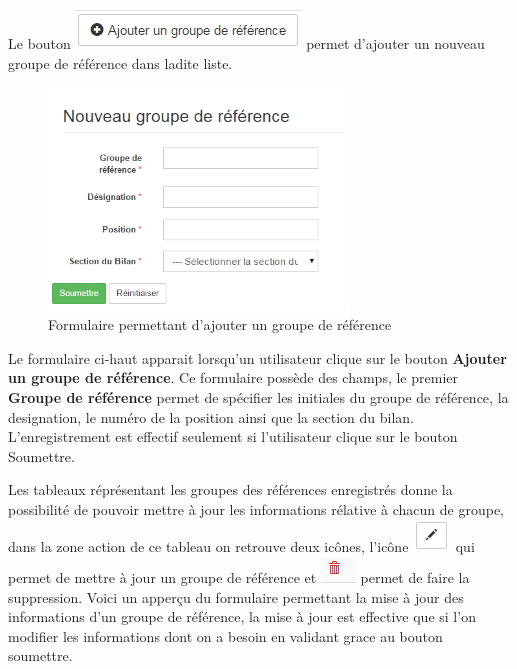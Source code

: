 \documentclass[12pt,a4paper]{report}
\begin{document}
Le bouton \includegraphics[scale=0.7]{pic/AddREfGroup.png} permet d'ajouter un nouveau groupe de référence dans ladite liste.

\begin{figure}[h]
\begin{center}
\includegraphics[width=8cm]{pic/FormGrRef.png}
\end{center}
\caption{Formulaire permettant d'ajouter un groupe de référence}
\label{Formulaire permettant d'ajouter un groupe de référence}
\end{figure}

Le formulaire ci-haut apparait lorsqu'un utilisateur clique sur le bouton \textbf{Ajouter un groupe de référence}. Ce formulaire possède des champs, le premier \textbf{Groupe de référence} permet de spécifier les initiales du groupe de référence, la designation, le numéro de la position ainsi que la section du bilan.
L'enregistrement est effectif seulement si l'utilisateur clique sur le bouton Soumettre.

\newpage
Les tableaux réprésentant les groupes des références enregistrés donne la possibilité de pouvoir mettre à jour les informations rélative à chacun de groupe, dans la zone action de ce tableau on retrouve deux icônes, l'icône \includegraphics[scale=0.7]{pic/EditBlack.png} qui permet de mettre à jour un groupe de référence et \includegraphics[scale=0.7]{pic/DeleteWRed.png} permet de faire la suppression.
Voici un apperçu du formulaire permettant la mise à jour des informations d'un groupe de référence, la mise à jour est effective que si l'on modifier les informations dont on a besoin en validant grace au bouton soumettre. 
\end{document}
